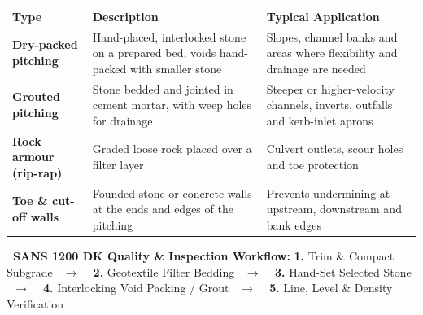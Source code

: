 \documentclass[a4paper,11pt]{article}
\begin{document}
{\fontsize{7.4pt}{9.0pt}\selectfont\noindent
\renewcommand{\arraystretch}{1.18}
\begin{tabularx}{\textwidth}{@{}p{3.2cm} p{6.4cm} X@{}}
\rowcolor{mhnavy}
{\color{white}\bfseries Type} & {\color{white}\bfseries Description} & {\color{white}\bfseries Typical Application} \\
\rowcolor{mhbluelight}
\bfseries Dry-packed pitching & Hand-placed, interlocked stone on a prepared bed, voids hand-packed with smaller stone & Slopes, channel banks and areas where flexibility and drainage are needed \\
\bfseries Grouted pitching & Stone bedded and jointed in cement mortar, with weep holes for drainage & Steeper or higher-velocity channels, inverts, outfalls and kerb-inlet aprons \\
\rowcolor{mhbluelight}
\bfseries Rock armour (rip-rap) & Graded loose rock placed over a filter layer & Culvert outlets, scour holes and toe protection \\
\bfseries Toe \& cut-off walls & Founded stone or concrete walls at the ends and edges of the pitching & Prevents undermining at upstream, downstream and bank edges \\
\end{tabularx}
\renewcommand{\arraystretch}{1}
}

\vspace{0.08cm}

\vfill

\noindent
\begin{tcolorbox}[
    enhanced, colback=white, colframe=mhnavy, boxrule=0.8pt, arc=3pt,
    left=8pt, right=8pt, top=5pt, bottom=5pt,
    drop shadow=black!3
]
    {\fontsize{7.8pt}{10.0pt}\selectfont\color{mhnavy}\bfseries\faCheckDouble\ SANS 1200 DK Quality \& Inspection Workflow:}\hspace{6pt}%
    {\fontsize{7.4pt}{9.8pt}\selectfont\color{mhtext}%
    \textbf{1.} Trim \& Compact Subgrade \ $\boldsymbol{\rightarrow}$ \ %
    \textbf{2.} Geotextile Filter Bedding \ $\boldsymbol{\rightarrow}$ \ %
    \textbf{3.} Hand-Set Selected Stone \ $\boldsymbol{\rightarrow}$ \ %
    \textbf{4.} Interlocking Void Packing / Grout \ $\boldsymbol{\rightarrow}$ \ %
    \textbf{5.} Line, Level \& Density Verification%
    }
\end{tcolorbox}
\end{document}
